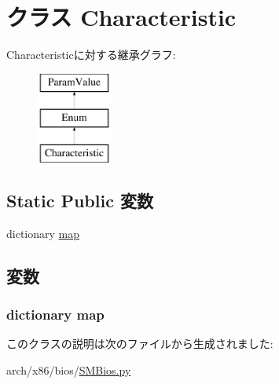 \hypertarget{classSMBios_1_1Characteristic}{
\section{クラス Characteristic}
\label{classSMBios_1_1Characteristic}
}
Characteristicに対する継承グラフ:\begin{figure}[H]
\begin{center}
\leavevmode
\includegraphics[height=3cm]{classSMBios_1_1Characteristic}
\end{center}
\end{figure}
\subsection*{Static Public 変数}
\begin{DoxyCompactItemize}
\item 
dictionary \hyperlink{classSMBios_1_1Characteristic_aca70ca58dda85cf4fe7a0737ec18e004}{map}
\end{DoxyCompactItemize}


\subsection{変数}
\hypertarget{classSMBios_1_1Characteristic_aca70ca58dda85cf4fe7a0737ec18e004}{
\subsubsection[{map}]{\setlength{\rightskip}{0pt plus 5cm}dictionary {\bf map}}}
\label{classSMBios_1_1Characteristic_aca70ca58dda85cf4fe7a0737ec18e004}


このクラスの説明は次のファイルから生成されました:\begin{DoxyCompactItemize}
\item 
arch/x86/bios/\hyperlink{SMBios_8py}{SMBios.py}\end{DoxyCompactItemize}
